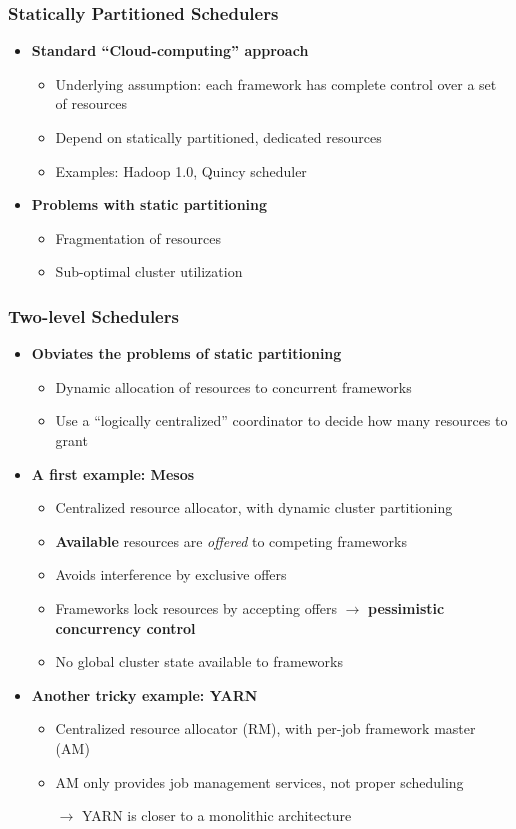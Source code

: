 \begin{frame}\frametitle{Statically Partitioned Schedulers}
\begin{itemize}
	\item {\bf Standard ``Cloud-computing'' approach}
	\begin{itemize}
		\item Underlying assumption: each framework has complete control over a set of resources
		\item Depend on statically partitioned, dedicated resources
		\item Examples: Hadoop 1.0, Quincy scheduler
	\end{itemize}

\vspace{20pt}

	\item {\bf Problems with static partitioning}
	\begin{itemize}
		\item Fragmentation of resources
		\item Sub-optimal cluster utilization
	\end{itemize}
\end{itemize}
\end{frame}

\begin{frame}\frametitle{Two-level Schedulers}
\begin{itemize}
	\item {\bf Obviates the problems of static partitioning}
	\begin{itemize}
		\item Dynamic allocation of resources to concurrent frameworks
		\item Use a ``logically centralized'' coordinator to decide how many resources to grant
	\end{itemize}
	\item {\bf A first example: Mesos}
	\begin{itemize}
		\item Centralized resource allocator, with dynamic cluster partitioning
		\item {\bf Available} resources are {\it offered} to competing frameworks
		\item Avoids interference by exclusive offers
		\item Frameworks lock resources by accepting offers $\to$ {\bf pessimistic concurrency control}
		\item No global cluster state available to frameworks
	\end{itemize}
	\item {\bf Another tricky example: YARN}
	\begin{itemize}
		\item Centralized resource allocator (RM), with per-job framework master (AM)
		\item AM only provides job management services, not proper scheduling
		\item[$\to$] YARN is closer to a monolithic architecture
	\end{itemize}
\end{itemize}
\end{frame}

